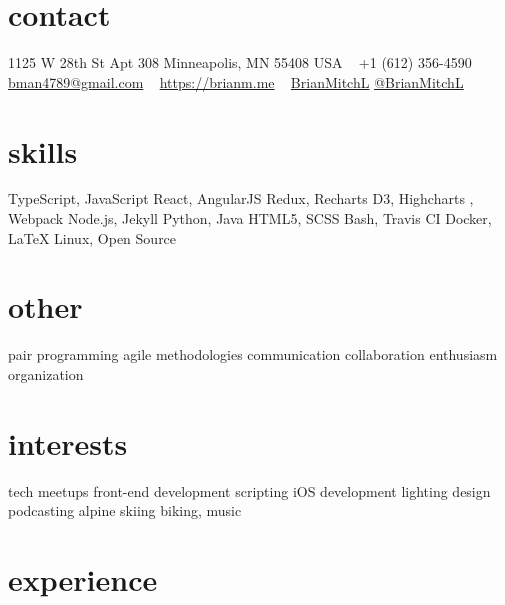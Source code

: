 \documentclass[]{cv-style} %
\begin{document}
\lastupdated


\begin{aside} %
\section{contact}
\small{1125 W 28th St
Apt 308
Minneapolis, MN 55408
USA}
~
+1 (612) 356-4590
~
\href{mailto:bman4789@gmail.com}{bman4789@gmail.com}
~
\href{https://brianm.me}{https://brianm.me}
~
\href{https://github.com/BrianMitchL}{\textcolor{darkgray}{ }BrianMitchL}
\href{https://twitter.com/BrianMitchL}{\textcolor{twitter}{ }@BrianMitchL}
\section{skills}
TypeScript, JavaScript
React, AngularJS
Redux, Recharts
D3, Highcharts
, Webpack
Node.js, Jekyll
Python, Java
HTML5, SCSS
Bash, Travis CI
Docker, \LaTeX
Linux, Open Source
\section{other}
pair programming
agile methodologies
communication
collaboration
enthusiasm
organization
\section{interests}
tech meetups
front-end development
scripting
iOS development
lighting design
podcasting
alpine skiing
biking, music
\end{aside}



\section{experience}

%
%
%
%
\end{document}
